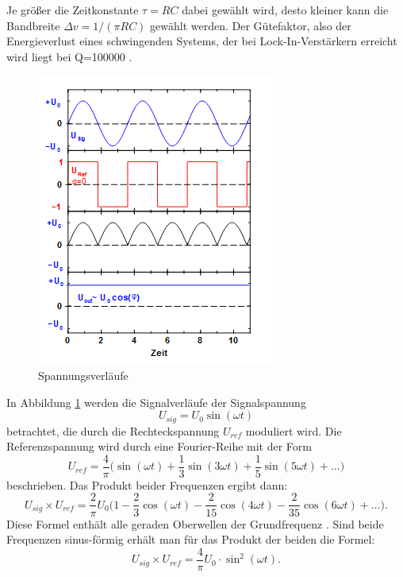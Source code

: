 Je größer die Zeitkonstante $\tau =RC$ dabei gewählt wird, desto kleiner kann die
Bandbreite $\Delta v=1/(\pi RC)$ gewählt werden.
Der Gütefaktor, also der Energieverlust eines schwingenden Systems,
der bei Lock-In-Verstärkern erreicht wird liegt bei Q=100000
\cite{303}.
\newpage
\begin{figure}[h]
  \centering
  \includegraphics{Bilder/Spannung.jpg}
  \caption{Spannungsverläufe}
  \label{fig:spannung}
\end{figure}
In Abbildung \ref{fig:spannung} werden die Signalverläufe der Signalspannung
\begin{equation}
  U_{sig}=U_0\sin(\omega t)
\end{equation}
betrachtet, die durch die Rechteckspannung $U_{ref}$ moduliert wird.
Die Referenzspannung wird durch eine Fourier-Reihe mit der Form
\begin{equation}
  U_{ref}=\frac{4}{\pi}\biggl(\sin(\omega t)+\frac{1}{3}\sin(3\omega t)
  +\frac{1}{5}\sin(5\omega t)+\dots\biggr)
\end{equation}
beschrieben. Das Produkt beider Frequenzen ergibt dann:
\begin{equation}
  U_{sig}\times U_{ref} =\frac{2}{\pi}U_0\biggl(1-\frac{2}{3}\cos(\omega t)
  -\frac{2}{15}\cos(4\omega t)-\frac{2}{35}\cos(6\omega t)+\dots\biggr).
\end{equation}
Diese Formel enthält alle geraden Oberwellen der Grundfrequenz \omega.
Sind beide Frequenzen sinus-förmig erhält man für das Produkt der beiden
die Formel:
\begin{equation}
  U_{sig}\times U_{ref}=\frac{4}{\pi}U_0 \cdot \sin^2(\omega t).
\end{equation}
